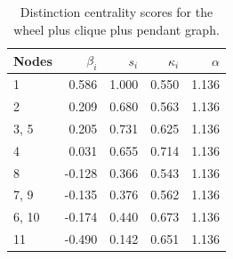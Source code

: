 \begin{table}
\centering
\caption{\label{tab:wcp2}Distinction centrality scores for the wheel plus clique plus pendant graph.}
\centering
\begin{tabular}[t]{lrrrr}
\toprule
Nodes & $\beta_i$ & $s_i$ & $\kappa_i$ & $\alpha$\\
\midrule
1 & 0.586 & 1.000 & 0.550 & 1.136\\
2 & 0.209 & 0.680 & 0.563 & 1.136\\
3, 5 & 0.205 & 0.731 & 0.625 & 1.136\\
4 & 0.031 & 0.655 & 0.714 & 1.136\\
8 & -0.128 & 0.366 & 0.543 & 1.136\\
7, 9 & -0.135 & 0.376 & 0.562 & 1.136\\
6, 10 & -0.174 & 0.440 & 0.673 & 1.136\\
11 & -0.490 & 0.142 & 0.651 & 1.136\\
\bottomrule
\end{tabular}
\end{table}
